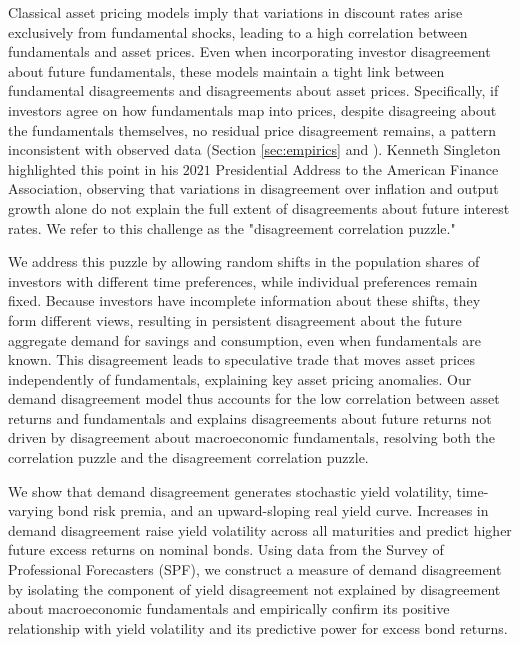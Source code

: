 \documentclass[preprint,11pt,authoryear]{elsarticle}
\theoremstyle{plain}
\begin{document}
Classical asset pricing models imply that variations in discount rates arise exclusively from fundamental shocks, leading to a high correlation between fundamentals and asset prices.  Even when incorporating investor disagreement about future fundamentals, these models maintain a tight link between fundamental disagreements and disagreements about asset prices. Specifically, if investors agree on how fundamentals map into prices, despite disagreeing about the fundamentals themselves, no residual price disagreement remains, a pattern inconsistent with observed data (Section \ref{sec:empirics} and \citep{GiacolettiLaursenSingleton2021}). Kenneth Singleton highlighted this point in his $2021$ Presidential Address to the American Finance Association, observing that variations in disagreement over inflation and output growth alone do not explain the full extent of disagreements about future interest rates. We refer to this challenge as the "disagreement correlation puzzle." %

We address this puzzle by allowing random shifts in the population shares of investors with different time preferences, while individual preferences remain fixed. Because investors have incomplete information about these shifts, they form different views, resulting in persistent disagreement about the future aggregate demand for savings and consumption, even when fundamentals are known. This disagreement leads to speculative trade that moves asset prices independently of fundamentals, explaining key asset pricing anomalies. Our demand disagreement model thus accounts for the low correlation between asset returns and fundamentals and explains disagreements about future returns not driven by disagreement about macroeconomic fundamentals, resolving both the correlation puzzle and the disagreement correlation puzzle. %


We show that demand disagreement generates stochastic yield volatility, time-varying bond risk premia, and an upward-sloping real yield curve. Increases in demand disagreement raise yield volatility across all maturities and predict higher future excess returns on nominal bonds. Using data from the Survey of Professional Forecasters (SPF), we construct a measure of demand disagreement by isolating the component of yield disagreement not explained by disagreement about macroeconomic fundamentals and empirically confirm its positive relationship with yield volatility and its predictive power for excess bond returns. %
\end{document}
